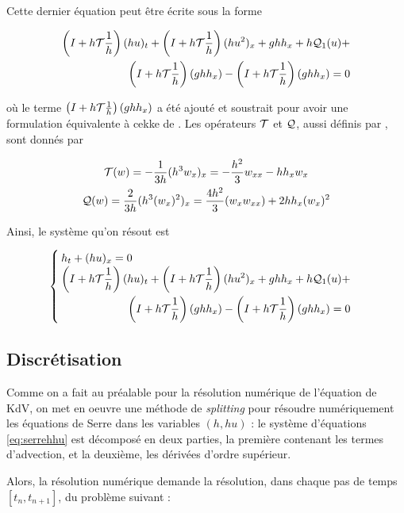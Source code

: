 \indent Cette dernier équation peut être écrite sous la forme

\begin{equation*}
\begin{split}
	\left(I + h\mathcal{T}\frac{1}{h} \right) (hu)_t + \left(I + h\mathcal{T}\frac{1}{h} \right)(hu^2)_x + ghh_x + h\mathcal{Q}_1(u) + \\ \left(I + h\mathcal{T}\frac{1}{h} \right) (ghh_x) - \left(I + h\mathcal{T}\frac{1}{h} \right) (ghh_x) = 0
\end{split}
\end{equation*}

\noindent où le terme $\left(I + h\mathcal{T}\frac{1}{h} \right)(ghh_x)$ a été ajouté et soustrait pour avoir une formulation équivalente à cekke de \cite{Bonneton2011}. Les opérateurs $\mathcal{T}$ et $\mathcal{Q}$, aussi définis par \cite{Bonneton2011}, sont donnés par

\begin{gather*}
	\mathcal{T}(w) = -\frac{1}{3h}(h^3w_x)_x = -\frac{h^2}{3}w_{xx} - hh_xw_x \\
	\mathcal{Q}(w) = \frac{2}{3h}(h^3(w_x)^2  )_x = \frac{4h^2}{3}(w_xw_{xx}) + 2hh_x(w_x)^2
\end{gather*}

\indent Ainsi, le système qu'on résout est 

\begin{equation}
\label{eq:serrehhu}
\begin{cases}
h_t + (hu)_x = 0 \\
\begin{split}
\left(I + h\mathcal{T}\frac{1}{h} \right) (hu)_t + \left(I + h\mathcal{T}\frac{1}{h} \right)(hu^2)_x + ghh_x + h\mathcal{Q}_1(u) + \\ \left(I + h\mathcal{T}\frac{1}{h} \right) (ghh_x) - \left(I + h\mathcal{T}\frac{1}{h} \right) (ghh_x) = 0
\end{split}
\end{cases}
\end{equation}


\subsection{Discrétisation}

\indent Comme on a fait au préalable pour la résolution numérique de l'équation de KdV, on met en oeuvre une méthode de \emph{splitting} pour résoudre numériquement les équations de Serre dans les variables $(h,hu)$ : le système d'équations \eqref{eq:serrehhu} est décomposé en deux parties, la première contenant les termes d'advection, et la deuxième, les dérivées d'ordre supérieur.

\indent Alors, la résolution numérique demande la résolution, dans chaque pas de temps $[t_n, t_{n+1}]$, du problème suivant :

